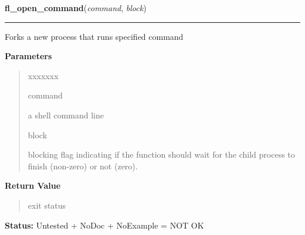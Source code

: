 \hspace{.8\funcindent}\begin{boxedminipage}{\funcwidth}

    \raggedright \textbf{fl\_open\_command}(\textit{command}, \textit{block})

    \vspace{-1.5ex}

    \rule{\textwidth}{0.5\fboxrule}
\setlength{\parskip}{2ex}
    Forks a new process that runs specified command

\setlength{\parskip}{1ex}
      \textbf{Parameters}
      \vspace{-1ex}

      \begin{quote}
        \begin{Ventry}{xxxxxxx}

          \item[command]

          a shell command line

          \item[block]

          blocking flag indicating if the function should wait for the 
          child process to finish (non-zero) or not (zero).

        \end{Ventry}

      \end{quote}

      \textbf{Return Value}
    \vspace{-1ex}

      \begin{quote}
      exit status

      \end{quote}

\textbf{Status:} Untested + NoDoc + NoExample = NOT OK



    \end{boxedminipage}

    \label{xformslib:library:fl_end_command}

    \vspace{0.5ex}

